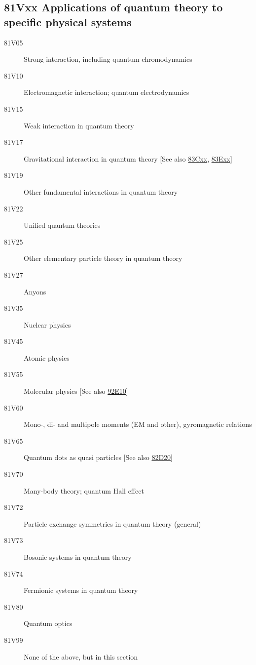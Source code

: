 \subsection*{81Vxx  Applications of quantum theory to specific physical systems }\label{81Vxx}
\begin{description}  
\item [81V05]\label{81V05} Strong interaction, including quantum chromodynamics
\item [81V10]\label{81V10} Electromagnetic interaction; quantum electrodynamics
\item [81V15]\label{81V15} Weak interaction in quantum theory
\item [81V17]\label{81V17} Gravitational interaction in quantum theory [See also \hyperref[83Cxx]{83Cxx}, \hyperref[83Exx]{83Exx}]
\item [81V19]\label{81V19} Other fundamental interactions in quantum theory
\item [81V22]\label{81V22} Unified quantum theories
\item [81V25]\label{81V25} Other elementary particle theory in quantum theory
\item [81V27]\label{81V27} Anyons
\item [81V35]\label{81V35} Nuclear physics
\item [81V45]\label{81V45} Atomic physics
\item [81V55]\label{81V55} Molecular physics [See also \hyperref[92E10]{92E10}]
\item [81V60]\label{81V60} Mono-, di- and multipole moments (EM and other), gyromagnetic relations
\item [81V65]\label{81V65} Quantum dots as quasi particles [See also \hyperref[82D20]{82D20}]
\item [81V70]\label{81V70} Many-body theory; quantum Hall effect
\item [81V72]\label{81V72} Particle exchange symmetries in quantum theory (general)
\item [81V73]\label{81V73} Bosonic systems in quantum theory
\item [81V74]\label{81V74} Fermionic systems in quantum theory
\item [81V80]\label{81V80} Quantum optics
\item [81V99]\label{81V99} None of the above, but in this section
\end{description}
